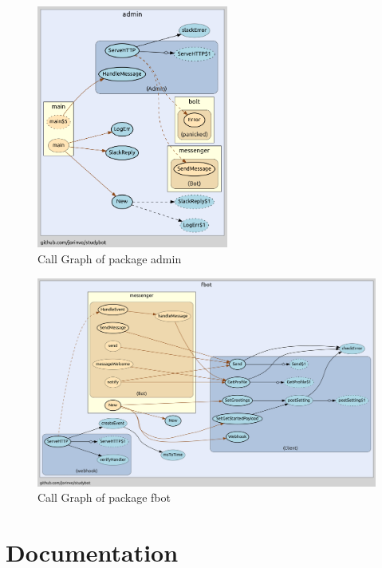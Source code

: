 \begin{figure}[H]
  \centering
  \includegraphics[height=8cm]{images/call-graph-admin.png}
	\caption{Call Graph of package admin}
\end{figure}

\begin{figure}[H]
  \centering
  \includegraphics[width=\textwidth]{images/call-graph-fbot.png}
	\caption{Call Graph of package fbot}
\end{figure}

\chapter{Documentation}
\label{a:docs}

\lstset{
	extendedchars=true,
	numbers=left,
	numberstyle=\tiny,
	breakautoindent  = true,
	breakindent      = 2em,
	breaklines       = true,
}

